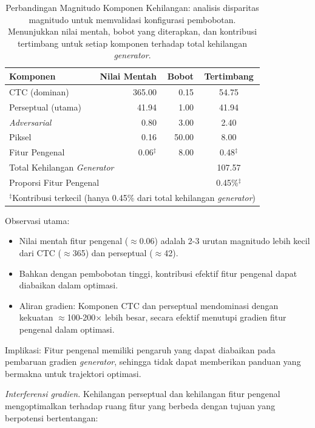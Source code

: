 \documentclass[journal]{IEEEtran}
\begin{document}
\begin{table}[!t]
\centering
\footnotesize
\caption{Perbandingan Magnitudo Komponen Kehilangan: analisis disparitas magnitudo untuk memvalidasi konfigurasi pembobotan. Menunjukkan nilai mentah, bobot yang diterapkan, dan kontribusi tertimbang untuk setiap komponen terhadap total kehilangan \textit{generator}.}
\label{table_loss_magnitude}
\begin{tabular}{lrrc}
\hline
\textbf{Komponen} & \textbf{Nilai Mentah} & \textbf{Bobot} & \textbf{Tertimbang} \\
\hline
CTC (dominan) & 365.00 & 0.15 & 54.75 \\
Perseptual (utama) & 41.94 & 1.00 & 41.94 \\
\textit{Adversarial} & 0.80 & 3.00 & 2.40 \\
Piksel & 0.16 & 50.00 & 8.00 \\
Fitur Pengenal & 0.06$^{\ddagger}$ & 8.00 & 0.48$^{\ddagger}$ \\
\hline
\multicolumn{3}{l}{Total Kehilangan \textit{Generator}} & 107.57 \\
\multicolumn{3}{l}{Proporsi Fitur Pengenal} & 0.45\%$^{\ddagger}$ \\
\multicolumn{4}{l}{\footnotesize $^{\ddagger}$Kontribusi terkecil (hanya 0.45\% dari total kehilangan \textit{generator})} \\
\hline
\end{tabular}
\end{table}

Observasi utama:
\begin{itemize}
    \item Nilai mentah fitur pengenal ($\approx$0.06) adalah 2-3 urutan magnitudo lebih kecil dari CTC ($\approx$365) dan perseptual ($\approx$42).
    \item Bahkan dengan pembobotan tinggi, kontribusi efektif fitur pengenal dapat diabaikan dalam optimasi.
    \item Aliran gradien: Komponen CTC dan perseptual mendominasi dengan kekuatan $\approx$100-200$\times$ lebih besar, secara efektif menutupi gradien fitur pengenal dalam optimasi.
\end{itemize}

Implikasi: Fitur pengenal memiliki pengaruh yang dapat diabaikan pada pembaruan gradien \textit{generator}, sehingga tidak dapat memberikan panduan yang bermakna untuk trajektori optimasi.

\textit{Interferensi gradien.} Kehilangan perseptual dan kehilangan fitur pengenal mengoptimalkan terhadap ruang fitur yang berbeda dengan tujuan yang berpotensi bertentangan:
\end{document}
